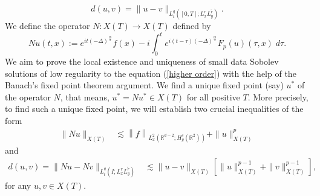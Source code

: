 \documentclass[a4paper,11pt, reqno]{amsart}
\theoremstyle{definition}
\theoremstyle{remark}
\numberwithin{equation}{section}
\begin{document}
	$$
	d(u, v)=\|u-v\|_{L_t^q\left([0,T] ; L_x^r L_y^{\tilde{r}}\right)}. 
	$$ 	
	We define the  operator  $N: X(T)\to X(T)$ defined  by $$Nu(t, x):=e^{i t (-\Delta)^{\frac{m}{2}}} f(x)-i \int_0^t e^{i(t-\tau) (-\Delta)^{\frac{m}{2}}} F_p(u)(\tau, x)\; d \tau.$$
	We aim to prove the local existence and uniqueness of small data Sobolev solutions of low regularity to the  equation (\ref{higher order}) with
	the help of the Banach's  fixed point theorem argument.  We find a  unique fixed point (say) $u^*$ of the operator $N$, that means, $u^*=N u^* \in X(T)$ for all positive $T$. More precisely, to find such a unique fixed point,   we will establish two crucial inequalities of the form
	\begin{align}\label{Banach1}
		\|N u\|_{X(T)} & \lesssim  \left\|f\right\|_{L_x^2\left(\mathbb{R}^{d-2} ; H_y^s\left(\mathbb{R}^2\right)\right)}+\|u\|_{X(T)}^p  \end{align}
	and \begin{align}\label{Banach2}
		d(u, v)=\|Nu-Nv\|_{L_t^q\left(I ; L_x^r L_y^{\tilde{r}}\right)}& \lesssim\|u-v\|_{X(T)}\left[  \|u\|_{X(T)}^{p-1}+\|v\|_{X(T)}^{p-1}\right],
	\end{align}
	for any $u, v \in X(T)$. 
	
\end{document}
